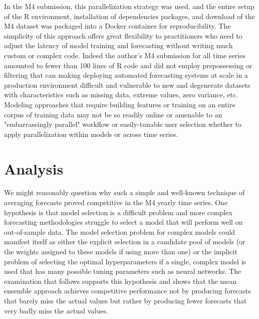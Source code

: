 \documentclass[11pt,3p,review,authoryear]{elsarticle}
\begin{document}
In the M4 submission, this parallelization strategy was used, and the entire setup of the R environment, installation of dependencies packages, and download of the M4 dataset was packaged into a Docker container for reproducibility. The simplicity of this approach offers great flexibility to practitioners who need to adjust the latency of model training and forecasting without writing much custom or complex code. Indeed the author's M4 submission for all time series amounted to fewer than 100 lines of R code and did not employ prepossessing or filtering that can making deploying automated forecasting systems at scale in a production environment difficult and vulnerable to new and degenerate datasets with characteristics such as missing data, extreme values, zero variance, etc. Modeling approaches that require building features or training on an entire corpus of training data may not be so readily online or amenable to an "embarrassingly parallel" workflow or easily-tunable user selection whether to apply parallelization within models or across time series.


\section{Analysis}
We might reasonably question why such a simple and well-known technique of averaging forecasts proved competitive in the M4 yearly time series. One hypothesis is that model selection is a difficult problem and more complex forecasting methodologies struggle to select a model that will perform well on out-of-sample data. The model selection problem for complex models could manifest itself as either the explicit selection in a candidate pool of models (or the weights assigned to these models if using more than one) or the implicit problem of selecting the optimal hyperparameters if a single, complex model is used that has many possible tuning parameters such as neural networks. The examination that follows supports this hypothesis and shows that the mean ensemble approach achieves competitive performance not by producing forecasts that barely miss the actual values but rather by producing fewer forecasts that very badly miss the actual values.
\end{document}
